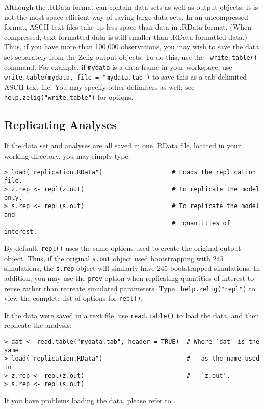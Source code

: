 Although the .RData format can contain data sets as well as output
objects, it is not the most space-efficient way of saving large data
sets.  In an uncompressed format, ASCII text files take up less space
than data in .RData format.  (When compressed, text-formatted data is
still smaller than .RData-formatted data.)  Thus, if you have more
than 100,000 observations, you may wish to save the data set
separately from the Zelig output objects.  To do this, use the {\tt
  write.table()} command.  For example, if {\tt mydata} is a data
frame in your workspace, use {\tt write.table(mydata, file =
  "mydata.tab")} to save this as a tab-delimited ASCII text file.  You
may specify other delimiters as well; see {\tt
  help.zelig("write.table")} for options.

\subsection{Replicating Analyses}

If the data set and analyses are all saved in one .RData file, located
in your working directory, you may simply type:
\begin{verbatim}
> load("replication.RData")                   # Loads the replication file.  
> z.rep <- repl(z.out)                        # To replicate the model only. 
> s.rep <- repl(s.out)                        # To replicate the model and 
                                              #  quantities of interest.  
\end{verbatim}
By default, {\tt repl()} uses the same options used to create the
original output object.  Thus, if the original {\tt s.out} object used
bootstrapping with 245 simulations, the {\tt s.rep} object will
similarly have 245 bootstrapped simulations.  In addition, you may use
the {\tt prev} option when replicating quantities of interest to reuse
rather than recreate simulated parameters.  Type {\tt
  help.zelig("repl")} to view the complete list of options for
{\tt repl()}.

If the data were saved in a text file, use {\tt read.table()} to load
the data, and then replicate the analysis:
\begin{verbatim}
> dat <- read.table("mydata.tab", header = TRUE)  # Where `dat' is the same
> load("replication.RData")                       #   as the name used in 
> z.rep <- repl(z.out)                            #   `z.out'.
> s.rep <- repl(s.out)  
\end{verbatim}
If you have problems loading the data, please refer to .

